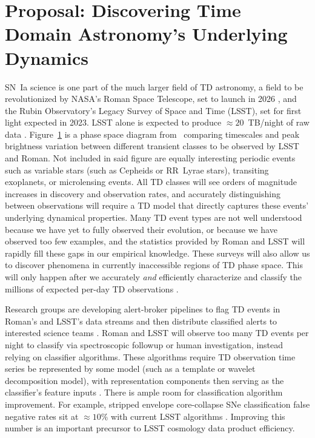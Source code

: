 \documentclass[modern]{aastex631}
\begin{document}
\section{Proposal: Discovering Time Domain Astronomy's Underlying Dynamics}
\begin{figure}
    \caption{}
    \label{fig:fig2}
\end{figure}
SN~Ia science is one part of the much larger field of TD astronomy, a field to be revolutionized by NASA's Roman Space Telescope, set to launch in 2026 \citep{Akeson2019}, and the Rubin Observatory's Legacy Survey of Space and Time (LSST), set for first light expected in 2023. 
LSST alone is expected to produce $\approx20$~TB/night of raw data \citep{Zeljko2019}.  
Figure~\ref{fig:fig2} is a phase space diagram from~\cite{Zeljko2019} comparing timescales and peak brightness variation between different transient classes to be observed by LSST and Roman. 
Not included in said figure are equally interesting periodic events such as variable stars (such as Cepheids or RR~Lyrae stars), transiting exoplanets, or microlensing events. 
All TD classes will see orders of magnitude increases in discovery and observation rates, and accurately distinguishing between observations will require a TD model that directly captures these events' underlying dynamical properties. 
Many TD event types are not well understood because we have yet to fully observed their evolution, or because we have observed too few examples, and the statistics provided by Roman and LSST will rapidly fill these gaps in our empirical knowledge. 
These surveys will also allow us to discover phenomena in currently inaccessible regions of TD phase space. 
This will only happen after we accurately \textit{and} efficiently characterize and classify the millions of expected per-day TD observations \citep{Narayan2018}. 

Research groups are developing alert-broker pipelines to flag TD events in Roman's and LSST's data streams and then distribute classified alerts to interested science teams \citep{Narayan2018, Raen2022}. 
Roman and LSST will observe too many TD events per night to classify via spectroscopic followup or human investigation, instead relying on classifier algorithms. 
These algorithms require TD observation time series be represented by some model (such as a template or wavelet decomposition model), with representation components then serving as the classifier's feature inputs \citep{Malz2019}. 
There is ample room for classification algorithm improvement.
For example, stripped envelope core-collapse SNe classification false negative rates sit at $\approx10\%$ with current LSST algorithms \citep{Malz2019}. 
Improving this number is an important precursor to LSST cosmology data product efficiency. 
\end{document}
